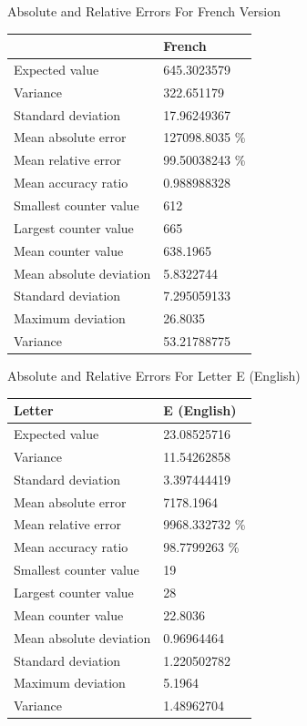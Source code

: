 \documentclass[]{revdetua}
\begin{document}
\begin{table}[!ht]
    \centering
    Absolute and Relative Errors For French Version
    \begin{tabular}{|l|l|}
    \hline
        ~ & French \\ \hline
        Expected value & 645.3023579 \\ \hline
        Variance & 322.651179 \\ \hline
        Standard deviation & 17.96249367 \\ \hline
        Mean absolute error & 127098.8035 \% \\ \hline
        Mean relative error & 99.50038243 \% \\ \hline
        Mean accuracy ratio & 0.988988328 \\ \hline
        Smallest counter value & 612 \\ \hline
        Largest counter value & 665 \\ \hline
        Mean counter value & 638.1965 \\ \hline
        Mean absolute deviation & 5.8322744 \\ \hline
        Standard deviation & 7.295059133 \\ \hline
        Maximum deviation & 26.8035 \\ \hline
        Variance & 53.21788775 \\ \hline
    \end{tabular}
\end{table}

\begin{table}[!ht]
    \centering
    Absolute and Relative Errors For Letter E (English)
    \begin{tabular}{|l|l|}
    \hline
        Letter & E (English) \\ \hline
        Expected value & 23.08525716 \\ \hline
        Variance & 11.54262858 \\ \hline
        Standard deviation & 3.397444419 \\ \hline
        Mean absolute error & 7178.1964 \\ \hline
        Mean relative error & 9968.332732 \% \\ \hline
        Mean accuracy ratio & 98.7799263 \% \\ \hline
        Smallest counter value & 19 \\ \hline
        Largest counter value & 28 \\ \hline
        Mean counter value & 22.8036 \\ \hline
        Mean absolute deviation & 0.96964464 \\ \hline
        Standard deviation & 1.220502782 \\ \hline
        Maximum deviation & 5.1964 \\ \hline
        Variance & 1.48962704 \\ \hline
    \end{tabular}
\end{table}
\end{document}
